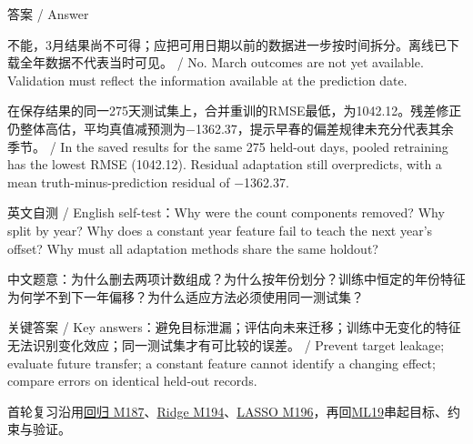\begin{StudySolution}{答案 / Answer}


不能，3月结果尚不可得；应把可用日期以前的数据进一步按时间拆分。离线已下载全年数据不代表当时可见。 / No. March outcomes are not yet available. Validation must reflect the information available at the prediction date.


\end{StudySolution}


在保存结果的同一275天测试集上，合并重训的RMSE最低，为1042.12。残差修正仍整体高估，平均真值减预测为\ensuremath{-}1362.37，提示早春的偏差规律未充分代表其余季节。 / In the saved results for the same 275 held-out days, pooled retraining has the lowest RMSE (1042.12). Residual adaptation still overpredicts, with a mean truth-minus-prediction residual of \ensuremath{-}1362.37.







英文自测 / English self-test：Why were the count components removed? Why split by year? Why does a constant year feature fail to teach the next year's offset? Why must all adaptation methods share the same holdout?


中文题意：为什么删去两项计数组成？为什么按年份划分？训练中恒定的年份特征为何学不到下一年偏移？为什么适应方法必须使用同一测试集？


关键答案 / Key answers：避免目标泄漏；评估向未来迁移；训练中无变化的特征无法识别变化效应；同一测试集才有可比较的误差。 / Prevent target leakage; evaluate future transfer; a constant feature cannot identify a changing effect; compare errors on identical held-out records.


首轮复习沿用\href{https://crazyshout.github.io/micro-course/cards.html\#CS5489-M187}{回归 M187}、\href{https://crazyshout.github.io/micro-course/cards.html\#CS5489-M194}{Ridge M194}、\href{https://crazyshout.github.io/micro-course/cards.html\#CS5489-M196}{LASSO M196}，再回\href{https://crazyshout.github.io/micro-course/?lesson=ml19}{ML19}串起目标、约束与验证。


